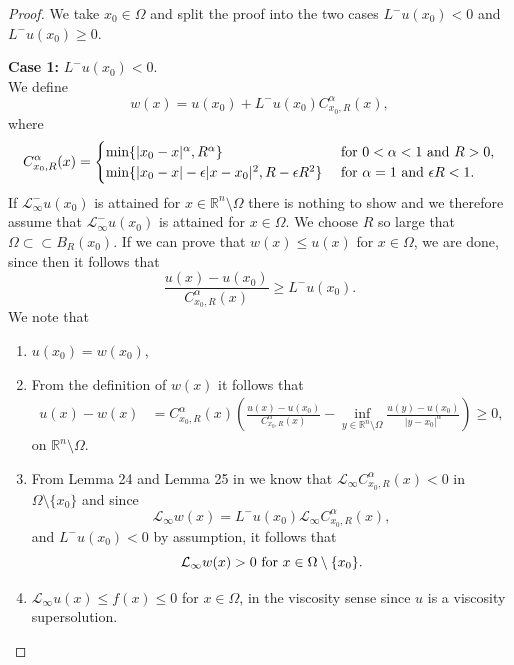 \documentclass[11pt]{article}
\providecommand{\Linf}{\mathcal{L}_{\infty}}
\providecommand{\Lneg}{\mathcal{L}_{\infty}^-}
\providecommand{\Rn}{\mathbb{R}^n}
\numberwithin{equation}{section}
\theoremstyle{definition}
\begin{document}
\begin{proof}
We take $x_0 \in \Omega$ and split the proof into the two cases $L^- u(x_0) < 0$ and $L^- u(x_0) \geq 0$.

\textbf{Case 1:} $L^- u(x_0) < 0$. \\
We define
$$
w(x) = u(x_0) + L^- u(x_0) C_{x_0,R}^{\alpha}(x),
$$
where 
\begin{align*}  
C_{x_0,R}^{\alpha}(x) =
\begin{cases}
\textup{min}\{|x_0-x|^{\alpha}, R^{\alpha} \} &  \textup{ for }  0 < \alpha <1 \textup{ and }R>0, \\
\textup{min}\{|x_0-x|-\epsilon |x-x_0|^2, R-\epsilon R^2\}  &  \textup{ for }  \alpha = 1 \textup{ and } \epsilon R<1.
\end{cases}
\end{align*}
 If $\Lneg u(x_0)$ is attained for $x \in \Rn \setminus \Omega$ there is nothing to show and we therefore assume that $\Lneg u(x_0)$ is attained for $x \in \Omega$. We choose $R$ so large that $\Omega \subset \subset B_R(x_0)$.
If we can prove that $w(x) \leq u(x)$ for $x \in \Omega$, we are done, since then it follows that
$$
\frac{u(x)-u(x_0)}{C_{x_0,R}^{\alpha}(x)} \geq L^-u(x_0).
$$
 We note that
\begin{enumerate}
\item $u(x_0) = w(x_0)$,
\item From the definition of $w(x)$ it follows that
\begin{align*}
    u(x)-w(x) & = C_{x_0,R}^{\alpha}(x) \left(\frac{u(x)-u(x_0)}{C_{x_0,R}^{\alpha}(x)}- \inf_{y \in \Rn \setminus \Omega} \frac{u(y)-u(x_0)}{|y-x_0|^{\alpha}} \right) \geq 0,
\end{align*}
 on $ \Rn \setminus \Omega$.
\item From Lemma 24 and Lemma 25 in \cite{LL2012} we know that $\Linf  C_{x_0,R}^{\alpha}(x) < 0$ in $\Omega \setminus \{x_0\}$ and since
 $$
 \mathcal{L}_{\infty}w(x) = L^-u(x_0)\mathcal{L}_{\infty} C_{x_0,R}^{\alpha}(x),
 $$
 and $L^- u(x_0)< 0$ by assumption, it follows that 
 $$\Linf w(x) > 0 \textup{ for } x \in \Omega \setminus \{x_0\}.
 $$
 \item $\Linf u(x) \leq f(x) \leq 0$ for $x \in \Omega$, in the viscosity sense since $u$ is a viscosity supersolution.
\end{enumerate}


\end{proof}
\end{document}
